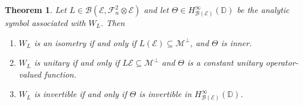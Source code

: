\documentclass[12pt]{amsart}
\newtheorem{theorem}{Theorem}[section]
\theoremstyle{definition}
\theoremstyle{remark}
\def \D{\mathbb{D}}
\newcommand{\clb}{\mathcal{B}}
\newcommand{\cle}{\mathcal{E}}
\newcommand{\clm}{\mathcal{M}}
\newcommand{\clf}{\mathcal{F}}
\numberwithin{equation}{section}
\begin{document}
\begin{theorem}\label{thm:operator_characterization_symbol}
Let $L \in \clb(\cle,\clf_n^2\otimes \cle)$
and let $\Theta \in H^\infty_{\clb(\cle)}(\D)$
be the analytic symbol associated with  $W_L.$
Then 
\begin{enumerate}
    \item \(W_L\) is an isometry if and only if \(L(\cle)\subseteq \clm^\perp\), and \(\Theta\) is inner.

   \item \(W_L\) is unitary if and only if $L\cle\subseteq \clm^\perp$
and \(\Theta\) is a constant unitary operator-valued function.

   \item \(W_L\) is invertible if and only if \(\Theta\) is invertible in
\(H^\infty_{\clb(\cle)}(\D)\). 
 \end{enumerate}
\end{theorem}
\end{document}
